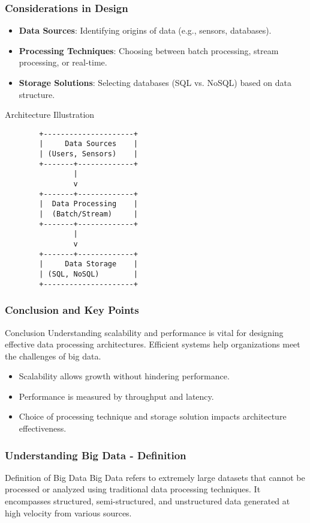 \documentclass[aspectratio=169]{beamer}
\begin{document}
\begin{frame}[fragile]
    \frametitle{Considerations in Design}
    \begin{itemize}
        \item \textbf{Data Sources}: Identifying origins of data (e.g., sensors, databases).
        \item \textbf{Processing Techniques}: Choosing between batch processing, stream processing, or real-time.
        \item \textbf{Storage Solutions}: Selecting databases (SQL vs. NoSQL) based on data structure.
    \end{itemize}

    \begin{block}{Architecture Illustration}
        \begin{verbatim}
        +---------------------+
        |     Data Sources    |
        | (Users, Sensors)    |
        +-------+-------------+
                |
                v
        +-------+-------------+
        |  Data Processing    |
        |  (Batch/Stream)     |
        +-------+-------------+
                |
                v
        +-------+-------------+
        |     Data Storage    |
        | (SQL, NoSQL)        |
        +---------------------+
        \end{verbatim}
    \end{block}
\end{frame}

\begin{frame}[fragile]
    \frametitle{Conclusion and Key Points}
    \begin{block}{Conclusion}
        Understanding scalability and performance is vital for designing effective data processing architectures. Efficient systems help organizations meet the challenges of big data.
    \end{block}

    \begin{itemize}
        \item Scalability allows growth without hindering performance.
        \item Performance is measured by throughput and latency.
        \item Choice of processing technique and storage solution impacts architecture effectiveness.
    \end{itemize}
\end{frame}

\begin{frame}[fragile]
    \frametitle{Understanding Big Data - Definition}
    \begin{block}{Definition of Big Data}
        Big Data refers to extremely large datasets that cannot be processed or analyzed using traditional data processing techniques. 
        It encompasses structured, semi-structured, and unstructured data generated at high velocity from various sources.
    \end{block}
\end{frame}
\end{document}
